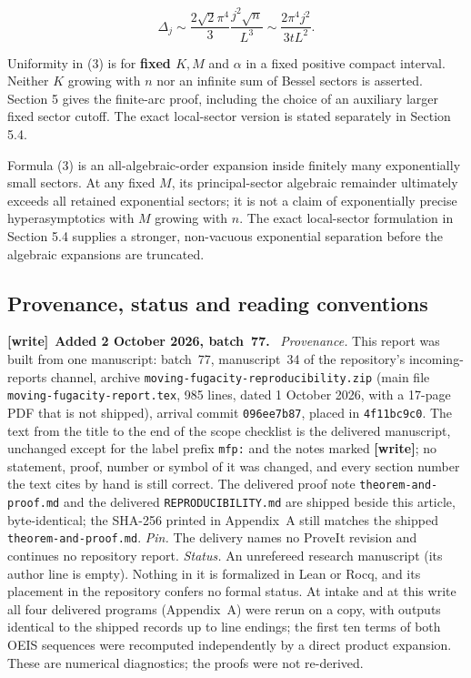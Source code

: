 \documentclass[11pt,letterpaper]{article}
\newenvironment{writenote}[1][]{\par\smallskip\begingroup\small
 \noindent\textbf{[write]}\if\relax\detokenize{#1}\relax\else~\textbf{#1.}\fi\ }%
 {\par\endgroup\smallskip}
\begin{document}
\[
 \Delta_j\sim\frac{2\sqrt2\pi^4}{3}\frac{j^2\sqrt n}{L^3}
 \sim\frac{2\pi^4j^2}{3tL^2}. \tag{4}
\]

Uniformity in (3) is for \textbf{fixed \(K,M\)} and \(\alpha\) in a
fixed positive compact interval. Neither \(K\) growing with \(n\) nor an
infinite sum of Bessel sectors is asserted. Section 5 gives the
finite-arc proof, including the choice of an auxiliary larger fixed
sector cutoff. The exact local-sector version is stated separately in
Section 5.4.

Formula (3) is an all-algebraic-order expansion inside finitely many
exponentially small sectors. At any fixed \(M\), its principal-sector
algebraic remainder ultimately exceeds all retained exponential sectors;
it is not a claim of exponentially precise hyperasymptotics with \(M\)
growing with \(n\). The exact local-sector formulation in Section 5.4
supplies a stronger, non-vacuous exponential separation before the
algebraic expansions are truncated.

\subsection{Provenance, status and reading conventions}\label{mfp:provenance}

\begin{writenote}[Added 2 October 2026, batch~77]
\emph{Provenance.} This report was built from one manuscript: batch~77,
manuscript~34 of the repository's incoming-reports channel, archive
\nolinkurl{moving-fugacity-reproducibility.zip} (main file
\nolinkurl{moving-fugacity-report.tex}, 985 lines, dated 1 October 2026,
with a 17-page PDF that is not shipped), arrival commit
\texttt{096ee7b87}, placed in \texttt{4f11bc9c0}. The text from the title
to the end of the scope checklist is the delivered manuscript, unchanged
except for the label prefix \texttt{mfp:} and the notes marked
\textbf{[write]}; no statement, proof, number or symbol of it was changed,
and every section number the text cites by hand is still correct. The delivered proof note \nolinkurl{theorem-and-proof.md}
and the delivered \nolinkurl{REPRODUCIBILITY.md} are shipped beside this
article, byte-identical; the SHA-256 printed in Appendix~A still matches
the shipped \nolinkurl{theorem-and-proof.md}. \emph{Pin.} The delivery
names no ProveIt revision and continues no repository report.
\emph{Status.} An unrefereed research manuscript (its author line is
empty). Nothing in it is formalized in Lean or Rocq, and its placement in
the repository confers no formal status. At intake and at this write all
four delivered programs (Appendix~A) were rerun on a copy, with outputs
identical to the shipped records up to line endings; the first ten terms
of both OEIS sequences were recomputed independently by a direct product
expansion. These are numerical diagnostics; the proofs were not
re-derived.
\end{writenote}
\end{document}
